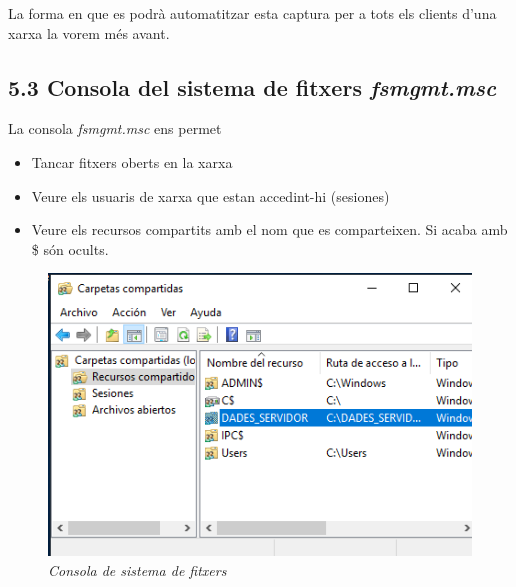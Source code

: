 \documentclass[
  a4paper,
]{article}
\providecommand{\tightlist}{%
  \setlength{\itemsep}{0pt}\setlength{\parskip}{0pt}}
\begin{document}
La forma en que es podrà automatitzar esta captura per a tots els
clients d'una xarxa la vorem més avant.

\subsection{\texorpdfstring{5.3 Consola del sistema de fitxers
\emph{fsmgmt.msc}}{5.3 Consola del sistema de fitxers fsmgmt.msc}}\label{consola-del-sistema-de-fitxers-fsmgmt.msc}

La consola \emph{fsmgmt.msc} ens permet

\begin{itemize}
\tightlist
\item
  Tancar fitxers oberts en la xarxa
\item
  Veure els usuaris de xarxa que estan accedint-hi (sesiones)
\item
  Veure els recursos compartits amb el nom que es comparteixen. Si acaba
  amb \$ són ocults.
\end{itemize}

\begin{figure}
\centering
\includegraphics{png/ADDS/fsmgmt.png}
\caption{\emph{Consola de sistema de fitxers}}
\end{figure}
\end{document}
